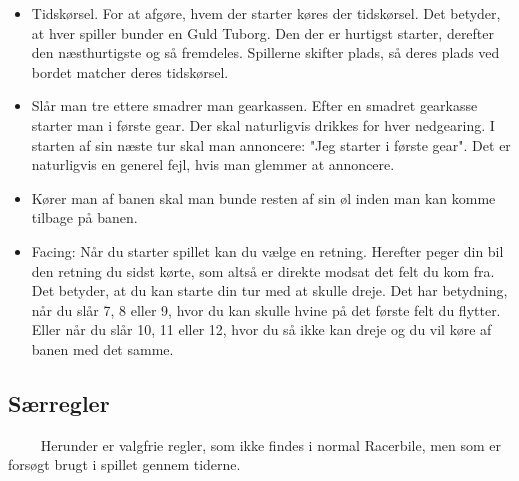 \documentclass[12pt]{article}
\begin{document}
\begin{itemize}
	\item Tidskørsel. For at afgøre, hvem der starter køres der tidskørsel. Det betyder, at hver spiller bunder en Guld Tuborg. Den der er hurtigst starter, derefter den næsthurtigste og så fremdeles. Spillerne skifter plads, så deres plads ved bordet matcher deres tidskørsel.
	\item Slår man tre ettere smadrer man gearkassen. Efter en smadret gearkasse starter man i første gear. Der skal naturligvis drikkes for hver nedgearing. I starten af sin næste tur skal man annoncere: "Jeg starter i første gear". Det er naturligvis en generel fejl, hvis man glemmer at annoncere.
	\item Kører man af banen skal man bunde resten af sin øl inden man kan komme tilbage på banen.
	\item Facing: Når du starter spillet kan du vælge en retning. Herefter peger din bil den retning du sidst kørte, som altså er direkte modsat det felt du kom fra. Det betyder, at du kan starte din tur med at skulle dreje. Det har betydning, når du slår 7, 8 eller 9, hvor du kan skulle hvine på det første felt du flytter. Eller når du slår 10, 11 eller 12, hvor du så ikke kan dreje og du vil køre af banen med det samme.
\end{itemize}


\subsection*{Særregler}

$\qquad$ Herunder er valgfrie regler, som ikke findes i normal Racerbile, men som er forsøgt brugt i spillet gennem tiderne.
\end{document}
